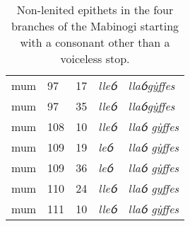 \begin{table}[]
\begin{tabular}{@{}lllll@{}}
\acrshort{mum}             & 97              & 17            & \textit{lleỽ}                   & \textit{llaỽgẏffes}         \\
\acrshort{mum}             & 97              & 35            & \textit{lleỽ}                   & \textit{llaỽgẏffes}         \\
\acrshort{mum}             & 108             & 10            & \textit{lleỽ}                   & \textit{llaỽ gẏffes}        \\
\acrshort{mum}             & 109             & 19            & \textit{leỽ}                    & \textit{llaỽ gẏffes}        \\
\acrshort{mum}             & 109             & 36            & \textit{leỽ}                    & \textit{llaỽ gẏffes}        \\
\acrshort{mum}             & 110             & 24            & \textit{lleỽ}                   & \textit{llaỽ gyffes}        \\
\acrshort{mum}             & 111             & 10            & \textit{lleỽ}                   & \textit{llaỽ gẏffes}        \\ \bottomrule
\end{tabular}
\caption{Non-lenited epithets in the four branches of the Mabinogi starting with a consonant other than a voiceless stop.}
\label{unlennontepithetspkm}
\end{table}